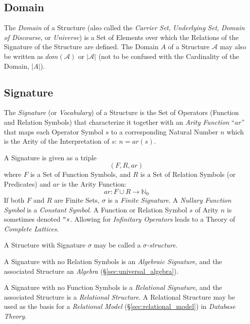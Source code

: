 \subsection{Domain}\label{sec:domain}

The \emph{Domain} of a Structure (also called the \emph{Carrier Set},
\emph{Underlying Set}, \emph{Domain of Discourse}, or \emph{Universe})
is a Set of Elements over which the Relations of the Signature of the
Structure are defined. The Domain $A$ of a Structure $\mathcal{A}$ may
also be written as $dom(\mathcal{A})$ or $|\mathcal{A}|$ (not to be
confused with the Cardinality of the Domain, $|A|$).



\subsection{Signature}\label{sec:signature}

The \emph{Signature} (or \emph{Vocabulary}) of a Structure is the Set
of Operators (Function and Relation Symbols) that characterize it
together with an \emph{Arity Function} ``$ar$'' that maps each
Operator Symbol $s$ to a corresponding Natural Number $n$ which is the
Arity of the Interpretation of $s$: $n = ar(s)$.

A Signature is given as a triple
\[
    (F,R,ar)
\]
where $F$ is a Set of Function Symbols, and $R$ is a Set of Relation
Symbols (or Predicates) and $ar$ is the Arity Function:
\[
    ar: F \cup R \rightarrow \mathbb{N}_0
\]
If both $F$ and $R$ are Finite Sets, $\sigma$ is a \emph{Finite
  Signature}. A \emph{Nullary Function Symbol} is a \emph{Constant
  Symbol}. A Function or Relation Symbol $s$ of Arity $n$ is sometimes
denoted $\prescript{n}{}{s}$. Allowing for \emph{Infinitary Operators}
leads to a Theory of \emph{Complete Lattices}.

A Structure with Signature $\sigma$ may be called a
\emph{$\sigma$-structure}.

A Signature with no Relation Symbols is an \emph{Algebraic
  Signature}, and the associated Structure an \emph{Algebra}
(\S\ref{sec:universal_algebra}).

A Signature with no Function Symbols is a \emph{Relational Signature},
and the associated Structure is a \emph{Relational Structure}. A
Relational Structure may be used as the basis for a \emph{Relational
  Model} (\S\ref{sec:relational_model}) in \emph{Database Theory}.

